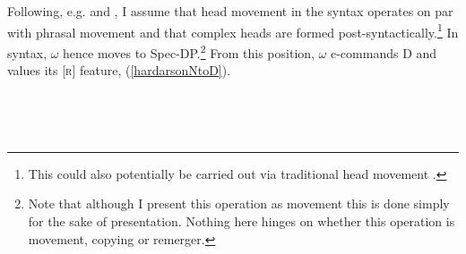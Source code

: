 \documentclass[output=paper,colorlinks,citecolor=brown,
]{langscibook}
\begin{document}
Following, e.g. \cite{Matushanski:2006ud} and \cite{Harizanov:2018ep}, I assume that head movement in the syntax operates on par with phrasal movement and that complex heads are formed post-syntactically.\footnote{This could also potentially be carried out via traditional head movement \citep[cf.][]{Hardarson:2016wd}.} In syntax, $\omega$ hence moves to Spec-DP.\footnote{Note that although I present this operation as movement this is done simply for the sake of presentation. Nothing here hinges on whether this operation is movement, copying or remerger.} From this position, $\omega$ c-commands D and values its [\textsc{r}] feature, (\ref{hardarsonNtoD}).

\begin{exe}
\setlength{\columnsep}{-10pt}
\begin{multicols}{2}
	\ex	~ \label{hardarsonPatIIIbase}\\
		\columnbreak
		
	\ex	~ \label{hardarsonNtoD}\\
\end{multicols}
\end{exe}\vspace{-15pt}
\end{document}
